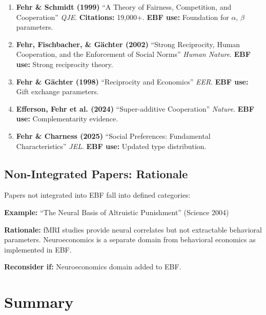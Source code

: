 \begin{enumerate}
    \item \textbf{Fehr \& Schmidt (1999)} ``A Theory of Fairness, Competition,
          and Cooperation'' \textit{QJE}. \textbf{Citations:} 19,000+.
          \textbf{EBF use:} Foundation for $\alpha$, $\beta$ parameters.

    \item \textbf{Fehr, Fischbacher, \& Gächter (2002)} ``Strong Reciprocity,
          Human Cooperation, and the Enforcement of Social Norms''
          \textit{Human Nature}. \textbf{EBF use:} Strong reciprocity theory.

    \item \textbf{Fehr \& Gächter (1998)} ``Reciprocity and Economics''
          \textit{EER}. \textbf{EBF use:} Gift exchange parameters.

    \item \textbf{Efferson, Fehr et al. (2024)} ``Super-additive Cooperation''
          \textit{Nature}. \textbf{EBF use:} Complementarity evidence.

    \item \textbf{Fehr \& Charness (2025)} ``Social Preferences: Fundamental
          Characteristics'' \textit{JEL}. \textbf{EBF use:} Updated type distribution.
\end{enumerate}

\subsection{Non-Integrated Papers: Rationale}

Papers not integrated into EBF fall into defined categories:

\begin{tcolorbox}[colback=gray!5!white, colframe=gray!75!black,
    title=Neuroeconomics (42 papers) --- Outside EBF Scope]
\textbf{Example:} ``The Neural Basis of Altruistic Punishment'' (Science 2004)

\textbf{Rationale:} fMRI studies provide neural correlates but not extractable
behavioral parameters. Neuroeconomics is a separate domain from behavioral
economics as implemented in EBF.

\textbf{Reconsider if:} Neuroeconomics domain added to EBF.
\end{tcolorbox}


\section{Summary}
\label{sec:feh-summary}

